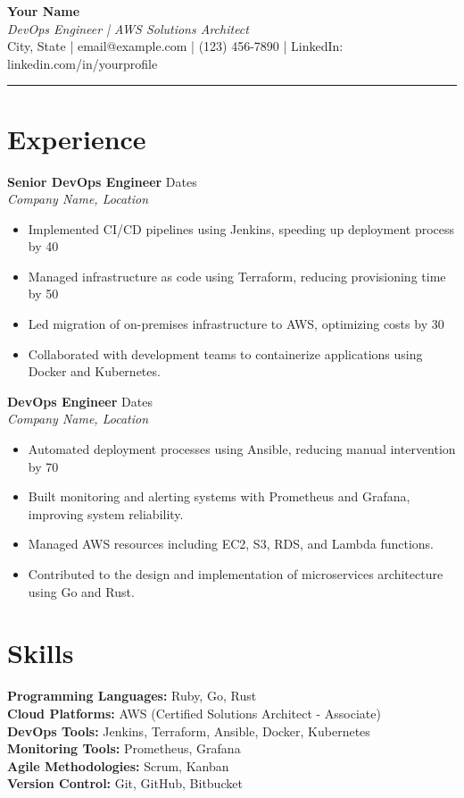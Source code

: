\documentclass[letterpaper,10pt]{article}
\newcommand{\hlinebreak}{\vspace{5pt}\hrule\vspace{5pt}}
\begin{document}
\noindent
\textbf{\huge Your Name} \\
\smallskip
\textit{DevOps Engineer | AWS Solutions Architect} \\
\smallskip
City, State | email@example.com | (123) 456-7890 | LinkedIn: linkedin.com/in/yourprofile

\hlinebreak

\section*{Experience}
\textbf{Senior DevOps Engineer} \hfill Dates \\
\textit{Company Name, Location}
\begin{itemize}[label=-]
    \item Implemented CI/CD pipelines using Jenkins, speeding up deployment process by 40%
    \item Managed infrastructure as code using Terraform, reducing provisioning time by 50%
    \item Led migration of on-premises infrastructure to AWS, optimizing costs by 30%
    \item Collaborated with development teams to containerize applications using Docker and Kubernetes.
\end{itemize}

\textbf{DevOps Engineer} \hfill Dates \\
\textit{Company Name, Location}
\begin{itemize}[label=-]
    \item Automated deployment processes using Ansible, reducing manual intervention by 70%
    \item Built monitoring and alerting systems with Prometheus and Grafana, improving system reliability.
    \item Managed AWS resources including EC2, S3, RDS, and Lambda functions.
    \item Contributed to the design and implementation of microservices architecture using Go and Rust.
\end{itemize}

\section*{Skills}
\textbf{Programming Languages:} Ruby, Go, Rust \\
\textbf{Cloud Platforms:} AWS (Certified Solutions Architect - Associate) \\
\textbf{DevOps Tools:} Jenkins, Terraform, Ansible, Docker, Kubernetes \\
\textbf{Monitoring Tools:} Prometheus, Grafana \\
\textbf{Agile Methodologies:} Scrum, Kanban \\
\textbf{Version Control:} Git, GitHub, Bitbucket
\end{document}
